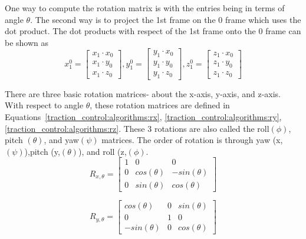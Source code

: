 One way to compute the rotation matrix is with the entries being in terms of angle $\theta$. The second way is to project the 1st frame on the 0 frame which uses the dot product.  The dot products with respect of the 1st frame onto the 0 frame can be shown as
\begin{equation}
	x^{0}_{1} = \left[\begin{array}{c}
				x_{1}\cdot x_{0} \\
			    x_{1}\cdot y_{0} \\
			    x_{1}\cdot z_{0}
				\end{array} \right],
	y^{0}_{1} = \left[\begin{array}{c}
				y_{1}\cdot x_{0} \\
				y_{1}\cdot y_{0} \\
				y_{1}\cdot z_{0}
	\end{array} \right],
	z^{0}_{1} = \left[\begin{array}{c}
				z_{1}\cdot x_{0} \\
				z_{1}\cdot y_{0} \\
				z_{1}\cdot z_{0}
	\end{array} \right]
\end{equation}

There are three basic rotation matrices- about the x-axis, y-axis, and z-axis. With respect to angle $\theta$, these rotation matrices are defined in
Equations~\ref{traction_control:algorithms:rx}, \ref{traction_control:algorithms:ry}, \ref{traction_control:algorithms:rz}. 
These 3 rotations are also called the roll$(\phi)$, pitch $(\theta)$, and yaw$(\psi)$ matrices. The order of rotation is through yaw (x,$(\psi)$),pitch (y,$(\theta)$), and roll (z,$(\phi)$. \\

\begin{equation}
	R_{x,\theta} = \left[\begin{array}{ccc}
				1 & 0 & 0 \\
				0 & cos(\theta) & -sin(\theta)  \\
				0 & sin(\theta) & cos(\theta) 
				\end{array}\right]
	\label{traction_control:algorithms:rx}
\end{equation}

\begin{equation}
	R_{y,\theta} = \left[\begin{array}{ccc}
		cos(\theta) & 0 & sin(\theta) \\
		0 & 1 & 0 \\
		-sin(\theta) & 0 & cos(\theta) 
	\end{array}\right]
	\label{traction_control:algorithms:ry}
\end{equation}

